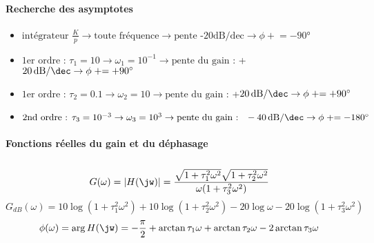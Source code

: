 \paragraph{Recherche des asymptotes}
\begin{itemize}
\item $\textrm{intégrateur } \frac{K}{p}     \rightarrow 
      \textrm{toute fréquence}               \rightarrow 
      \textrm{pente -20dB/dec}               \rightarrow 
      \phi\mathrel{+}=-90\si{\degree}$
\item $\textrm{1er ordre : }\tau_1=10          \rightarrow 
      \omega_1=10^{-1}                       \rightarrow 
      \textrm{pente du gain : } 
      $+$\SI[per-mode=symbol]{20}{\dB\per\dec}    \rightarrow 
      \phi\mathrel{+}=+90\si{\degree}$ 
\item $ \textrm{1er ordre : }\tau_2=0.1        \rightarrow 
      \omega_2=10                            \rightarrow 
      \textrm{pente du gain : } 
      $+$\SI[per-mode=symbol]{20}{\dB\per\dec}     \rightarrow 
      \phi\mathrel{+}=+90\si{\degree}$ 
\item $ \textrm{2nd ordre : }\tau_3=10^{-3} \rightarrow 
      \omega_3=10^3                          \rightarrow 
      \textrm{pente du gain : } 
      \SI[per-mode=symbol]{-40}{\dB\per\dec}     \rightarrow 
      \phi\mathrel{+}=-180\si{\degree}$ 
\end{itemize}
\begin{center}
    

    
\end{center}
\paragraph{Fonctions réelles du gain et du déphasage}$\,$\newline
\[
G(\omega)=|H(\jw)|=
\dfrac{\sqrt{1+\tau_1^2\omega^2}\sqrt{1+\tau_2^2\omega^2}}
      {\omega(1+\tau_3^2\omega^2)}
\]
\[
G_{dB}(\omega)=10\log{(1+\tau_1^2\omega^2)}
              +10\log{(1+\tau_2^2\omega^2)}
              -20\log{\omega}
              -20\log{(1+\tau_3^2\omega^2)}
\]
\[
\phi(\omega)=\arg{H(\jw)}=-\frac{\pi}{2}+\arctan{\tau_1\omega}
                                        +\arctan{\tau_2\omega}
                                       -2\arctan{\tau_3\omega}
\]
